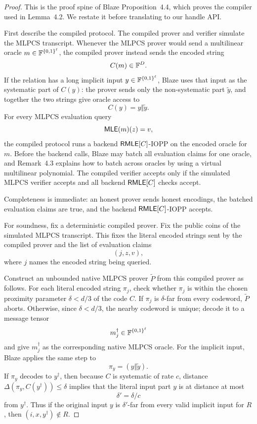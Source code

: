 \begin{proof}
This is the proof spine of Blaze Proposition~4.4, which proves the compiler
used in Lemma~4.2.  We restate it before translating to our handle API.

First describe the compiled protocol.  The compiled prover and verifier
simulate the MLPCS transcript.  Whenever the MLPCS prover would send a
multilinear oracle \(m\in\mathbb{F}^{\{0,1\}^\ell}\), the compiled prover instead sends the
encoded string
\[
  C(m)\in\mathbb{F}^D.
\]
If the relation has a long implicit input \(y\in\mathbb{F}^{\{0,1\}^\ell}\), Blaze uses
that input as the systematic part of \(C(y)\): the prover sends only the
non-systematic part \(\widetilde y\), and together the two strings give oracle
access to
\[
  C(y)=y\Vert\widetilde y.
\]
For every MLPCS evaluation query
\[
  \mathsf{MLE}(m)(z)=v,
\]
the compiled protocol runs a backend \(\mathsf{RMLE}[C]\)-IOPP on the encoded oracle
for \(m\).  Before the backend calls, Blaze may batch all evaluation claims for
one oracle, and Remark~4.3 explains how to batch across oracles by using a
virtual multilinear polynomial.  The compiled verifier accepts only if the
simulated MLPCS verifier accepts and all backend \(\mathsf{RMLE}[C]\) checks accept.

Completeness is immediate: an honest prover sends honest encodings, the batched
evaluation claims are true, and the backend \(\mathsf{RMLE}[C]\)-IOPP accepts.

For soundness, fix a deterministic compiled prover.  Fix the public coins of
the simulated MLPCS transcript.  This fixes the literal encoded strings sent by
the compiled prover and the list of evaluation claims
\[
  (j,z,v),
\]
where \(j\) names the encoded string being queried.

Construct an unbounded native MLPCS prover \(\widetilde P\) from this compiled
prover as follows.  For each literal encoded string \(\pi_j\), check whether
\(\pi_j\) is within the chosen proximity parameter \(\delta<d/3\) of the code
\(C\).  If \(\pi_j\) is \(\delta\)-far from every codeword, \(\widetilde P\)
aborts.  Otherwise, since \(\delta<d/3\), the nearby codeword is unique; decode
it to a message tensor
\[
  m_j^\dagger\in\mathbb{F}^{\{0,1\}^\ell}
\]
and give \(m_j^\dagger\) as the corresponding native MLPCS oracle.  For the
implicit input, Blaze applies the same step to
\[
  \pi_y=(y\Vert\widetilde y).
\]
If \(\pi_y\) decodes to \(y^\dagger\), then because \(C\) is systematic of rate
\(c\), distance \(\Delta(\pi_y,C(y^\dagger))\le\delta\) implies that the
literal input part \(y\) is at distance at most
\[
  \delta'=\delta/c
\]
from \(y^\dagger\).  Thus if the original input \(y\) is \(\delta'\)-far from
every valid implicit input for \(R\), then \((i,x,y^\dagger)\notin R\).


\end{proof}
